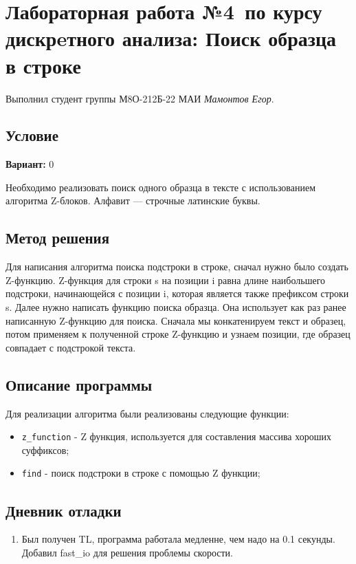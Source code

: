 \documentclass[12pt]{article}
\begin{document}
\section*{Лабораторная работа №4\, по курсу дискрeтного анализа: Поиск образца в строке}

Выполнил студент группы М8О-212Б-22 МАИ \textit{Мамонтов Егор}.

\subsection*{Условие}

\textbf{Вариант:} 0

Необходимо реализовать поиск одного образца в тексте с использованием алгоритма Z-блоков. Алфавит — строчные латинские буквы.

\newpage
\subsection*{Метод решения}

Для написания алгоритма поиска подстроки в строке, сначал нужно было создать Z-функцию. Z-функция для строки s на позиции i равна длине наибольшего подстроки, начинающейся с позиции i, которая является также префиксом строки s.
Далее нужно написать функцию поиска образца. Она использует как раз ранее написанную Z-функцию для поиска. Сначала мы конкатенируем текст и образец, потом применяем к полученной строке Z-функцию и узнаем позиции, где образец совпадает с подстрокой текста.
\subsection*{Описание программы}

Для реализации алгоритма были реализованы следующие функции:
\begin{itemize}
    \item \texttt{z\_function} - Z функция, используется для составления массива хороших суффиксов;
    \item \texttt{find} - поиск подстроки в строке с помощью Z функции;
\end{itemize}

\newpage
\subsection*{Дневник отладки}

\begin{enumerate}
    \item Был получен TL, программа работала медленне, чем надо на 0.1 секунды. Добавил fast\_io для решения проблемы скорости.
\end{enumerate}
\end{document}
